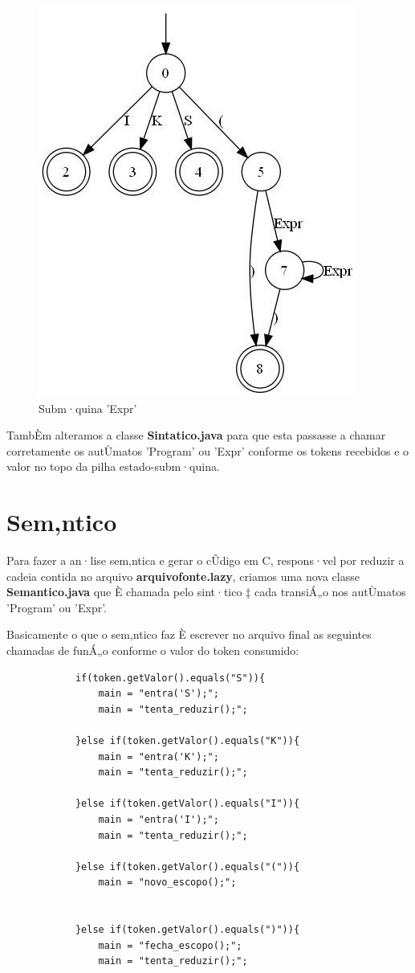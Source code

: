 \documentclass[12pt,a4paper]{article}
\begin{document}
\begin{figure}[ht!]
	\begin{center}
		\includegraphics[scale=0.60]{expr.jpg}
		\caption{Subm·quina 'Expr'}
		\label{fig:expr}
	\end{center}
\end{figure}

TambÈm alteramos a classe \textbf{Sintatico.java} para que esta passasse a chamar corretamente os autÙmatos 'Program' ou 'Expr' conforme os tokens recebidos e o valor no topo da pilha estado-subm·quina.


\section{Sem‚ntico}
Para fazer a an·lise sem‚ntica e gerar o cÛdigo em C, respons·vel por reduzir a cadeia contida no arquivo \textbf{arquivofonte.lazy}, criamos uma nova classe \textbf{Semantico.java} que È chamada pelo sint·tico ‡ cada transiÁ„o nos autÙmatos 'Program' ou 'Expr'.

Basicamente o que o sem‚ntico faz È escrever no arquivo final as seguintes chamadas de funÁ„o conforme o valor do token consumido:

\lstset{language=Java, basicstyle=\footnotesize}
\begin{lstlisting}
			if(token.getValor().equals("S")){
				main = "entra('S');";
				main = "tenta_reduzir();";
				
			}else if(token.getValor().equals("K")){
				main = "entra('K');";
				main = "tenta_reduzir();";
				
			}else if(token.getValor().equals("I")){
				main = "entra('I');";
				main = "tenta_reduzir();";
				
			}else if(token.getValor().equals("(")){
				main = "novo_escopo();";
				
				
			}else if(token.getValor().equals(")")){
				main = "fecha_escopo();";
				main = "tenta_reduzir();";
\end{lstlisting} 
\end{document}
